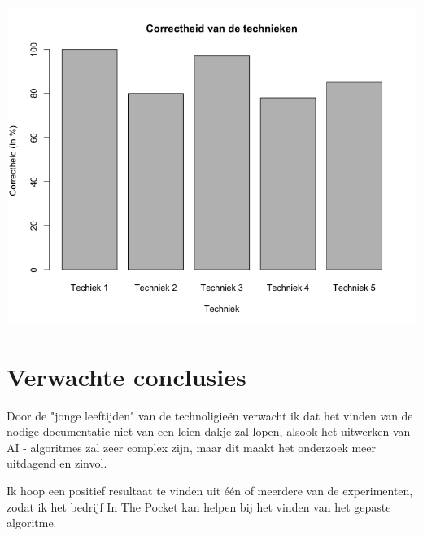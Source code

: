 \includegraphics[scale=0.3]{Correctheid_technieken}

\section{Verwachte conclusies}
\label{sec:verwachte_conclusies}
Door de "jonge leeftijden" van de technoligieën verwacht ik dat het vinden van de nodige documentatie niet van een leien dakje zal lopen, alsook het uitwerken van AI - algoritmes zal zeer complex zijn, maar dit maakt het onderzoek meer uitdagend en zinvol.

Ik hoop een positief resultaat te vinden uit één of meerdere van de experimenten, zodat ik het bedrijf In The Pocket kan helpen bij het vinden van het gepaste algoritme.
